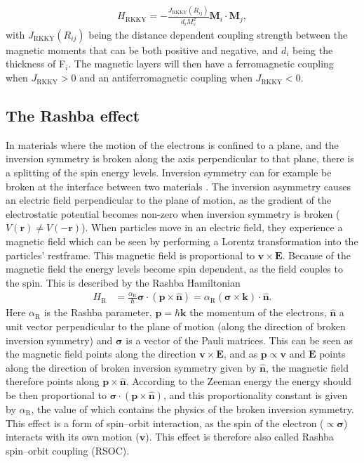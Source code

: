 \begin{align}
    H_{\text{RKKY}} = -\frac{J_{\text{RKKY}}(R_{ij})}{d_iM_s^2}\mathbold{M}_i\cdot\mathbold{M}_j,
\end{align}
with $J_{\text{RKKY}}(R_{ij})$ being the distance dependent coupling strength between the magnetic moments that can be both positive and negative, and $d_i$ being the thickness of F$_i$. The magnetic layers will then have a ferromagnetic coupling when $J_{\text{RKKY}}>0$ and an antiferromagnetic coupling when $J_{\text{RKKY}}<0$.

\subsection{The Rashba effect}
In materials where the motion of the electrons is confined to a plane, and the inversion symmetry is broken along the axis perpendicular to that plane, there is a splitting of the spin energy levels. Inversion symmetry can for example be broken at the interface between two materials \cite{Heide2006}. The inversion asymmetry causes an electric field perpendicular to the plane of motion, as the gradient of the electrostatic potential becomes non-zero when inversion symmetry is broken ($V(\mathbold{r}) \neq V(-\mathbold{r})$). When particles move in an electric field, they experience a magnetic field which can be seen by performing a Lorentz transformation into the particles' restframe. This magnetic field is proportional to $\mathbold{v}\times\mathbold{E}$. Because of the magnetic field the energy levels become spin dependent, as the field couples to the spin. This is described by the Rashba Hamiltonian \citep{BychovRashba1984}
\begin{align}
H_{\text{R}} &= \frac{\alpha_{\text{R}}}{\hbar}\mathbold{\sigma}\cdot(\mathbold{p}\times\mathbold{\hat{n}}) = \alpha_{\text{R}} (\mathbold{\sigma}\times\mathbold{k})\cdot\mathbold{\hat{n}}.
\label{eq:RashbaH}
\end{align}
Here $\alpha_{\text{R}}$ is the Rashba parameter, $\mathbold{p} = \hbar\mathbold{k}$ the momentum of the electrons, $\mathbold{\hat{n}}$ a unit vector perpendicular to the plane of motion (along the direction of broken inversion symmetry) and $\mathbold{\sigma}$ is a vector of the Pauli matrices. This can be seen as the magnetic field points along the direction $\mathbold{v}\times\mathbold{E}$, and as $\mathbold{p}\propto\mathbold{v}$ and $\mathbold{E}$ points along the direction of broken inversion symmetry given by $\mathbold{\hat{n}}$, the magnetic field therefore points along $\mathbold{p}\times\mathbold{\hat{n}}$. According to the Zeeman energy the energy should be then proportional to $\mathbold{\sigma}\cdot(\mathbold{p}\times\mathbold{\hat{n}})$, and this proportionality constant is given by $\alpha_{\text{R}}$, the value of which contains the physics of the broken inversion symmetry. This effect is a form of spin--orbit interaction, as the spin of the electron ($\propto \mathbold{\sigma}$) interacts with its own motion ($\mathbold{v}$). This effect is therefore also called Rashba spin--orbit coupling (RSOC).

